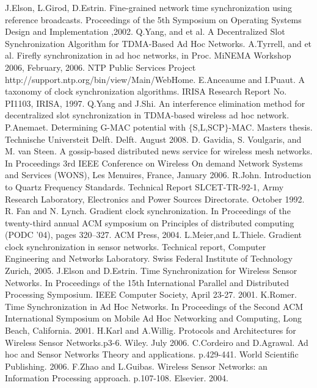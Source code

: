 \documentclass[a4paper,10pt]{report}
\begin{document}
\begin{thebibliography}{\textbf{References}}
J.Elson, L.Girod, D.Estrin. Fine-grained network time synchronization using reference broadcasts. Proceedings of the 5th Symposium on Operating Systems Design and Implementation ,2002.
Q.Yang, and et al. A Decentralized Slot Synchronization Algorithm for TDMA-Based Ad Hoc Networks.
A.Tyrrell, and et al. Firefly synchronization in ad hoc networks, in Proc. MiNEMA Workshop 2006, February, 2006.
NTP Public Services Project http://support.ntp.org/bin/view/Main/WebHome.
E.Anceaume and I.Puaut. A taxonomy of clock synchronization algorithms. IRISA Research Report No. PI1103, IRISA, 1997.
Q.Yang and J.Shi. An interference elimination method for decentralized slot synchronization in TDMA-based wireless ad hoc network.
 P.Anemaet. Determining G-MAC potential with $\{$S,L,SCP$\}$-MAC. Masters thesis. Technische Universteit Delft. Delft. August 2008.
D. Gavidia, S. Voulgaris, and M. van Steen. A gossip-based distributed news service for wireless mesh networks. In Proceedings 3rd IEEE Conference on Wireless On demand Network Systems and Services (WONS), Les Menuires, France, January 2006.
R.John. Introduction to Quartz Frequency Standards. Technical Report SLCET-TR-92-1, Army Research Laboratory, Electronics and Power Sources Directorate. October 1992.
R. Fan and N. Lynch. Gradient clock synchronization. In Proceedings of the twenty-third annual ACM symposium on Principles of distributed computing (PODC ’04), pages 320–327. ACM Press, 2004.
L.Meier,and L.Thiele. Gradient clock synchronization in sensor networks. Technical report, Computer Engineering and Networks Laboratory. Swiss Federal Institute of Technology Zurich, 2005.
J.Elson and D.Estrin. Time Synchronization for Wireless Sensor Networks. In Proceedings of the 15th International Parallel and Distributed Processing Symposium. IEEE Computer Society, April 23-27. 2001.
K.Romer. Time Synchronization in Ad Hoc Networks. In Proceedings of the Second ACM International Symposium on Mobile Ad Hoc Networking and Computing, Long Beach, California. 2001.
H.Karl and A.Willig. Protocols and Architectures for Wireless Sensor Networks.p3-6. Wiley. July 2006.
C.Cordeiro and D.Agrawal. Ad hoc and Sensor Networks Theory and applications. p.429-441. World Scientific Publishing. 2006.
F.Zhao and  L.Guibas. Wireless Sensor Networks: an Information Processing approach. p.107-108. Elsevier. 2004.

\end{thebibliography}
\end{document}
